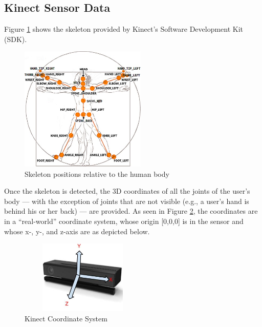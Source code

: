 \documentclass{sigchi}
\begin{document}
\subsection{Kinect Sensor Data}
Figure \ref{skeleton} shows the skeleton provided by Kinect's Software Development Kit (SDK).
\begin{figure}[h]
\centering
\includegraphics[width=60mm]{skeleton.jpg}
\caption{Skeleton positions relative to the human body}
\label{skeleton}
\end{figure}
Once the skeleton is detected, the 3D coordinates of all the joints of the
user's body --- with the exception of joints that are not visible (e.g., a user's
hand is behind his or her back) --- are provided.
As seen in Figure \ref{Coordinate}, the coordinates are in a ``real-world''
coordinate system, whose origin [0,0,0] is in the sensor and whose x-, y-, and
z-axis are as depicted below.
\begin{figure}[h]
\centering
\includegraphics[width=60mm, height=35mm]{KinectV2CoordinateSystem.jpg}
\caption{Kinect Coordinate System}
\label{Coordinate}
\end{figure}
\end{document}

